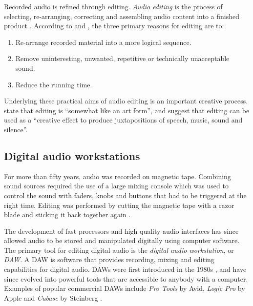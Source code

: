 Recorded audio is refined through editing. \textit{Audio editing} is the process of selecting, re-arranging,
correcting and assembling audio content into a finished product \citep[p. 112]{Hausman2012}.  According to
\citet[p.~44]{McLeish2015} and \citet[p.~116]{Hausman2012}, the three primary reasons for editing are to:

{\singlespacing
\begin{enumerate}
  \item Re-arrange recorded material into a more logical sequence.
  \item Remove uninteresting, unwanted, repetitive or technically unacceptable sound.
  \item Reduce the running time.
\end{enumerate}
}

Underlying these practical aims of audio editing is an important creative process.
\citet[p.~116]{Hausman2012} state that editing is ``somewhat like an art form'', and \citet[p.~44]{McLeish2015}
suggest that editing can be used as a ``creative effect to produce juxtapositions of speech, music, sound and silence''.

\subsection{Digital audio workstations}\label{sec:background-daw}

For more than fifty years, audio was recorded on magnetic tape. Combining sound sources required the use of a large
mixing console which was used to control the sound with faders, knobs and buttons that had to be triggered at the right
time. Editing was performed by cutting the magnetic tape with a razor blade and sticking it back together again
\citep{Barbour2004}.

The development of fast processors and high quality audio interfaces has since allowed audio to
be stored and manipulated digitally using computer software.
The primary tool for editing digital audio is the \textit{digital audio workstation}, or \textit{DAW}. A DAW is
software that provides recording, mixing and editing capabilities for digital audio.  DAWs were first introduced in the
1980s \citep{Ingebretsen1982}, and have since evolved into powerful tools that are accessible to anybody with a
computer. Examples of popular commercial DAWs include \textit{Pro Tools} by Avid, \textit{Logic Pro} by Apple and
\textit{Cubase} by Steinberg \citep{AskAudio2015,ProducerSpot2015}.

